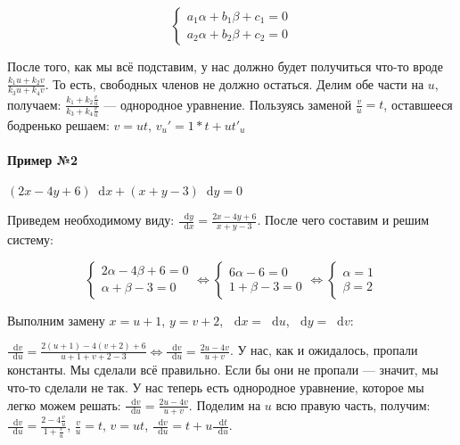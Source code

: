 \documentclass{article}
\newcommand*\diff{\mathop{}\!\mathrm{d}}
\begin{document}
\begin{enumerate}
    $$\begin{cases}
        a_1 \alpha + b_1 \beta + c_1 = 0 \\
        a_2 \alpha + b_2 \beta + c_2 = 0
    \end{cases}$$

    После того, как мы всё подставим, у нас должно будет получиться что-то вроде $\frac{k_1 u + k_2 v}{k_3 u + k_4 v}$. То есть, свободных членов не должно остаться. Делим обе части на $u$, получаем: $\frac{k_1 + k_2 \frac{v}{u}}{k_3 + k_4 \frac{v}{u}}$ — однородное уравнение. Пользуясь заменой $\frac{v}{u} = t$, оставшееся бодренько решаем: $v = ut$, $v_u' = 1 * t + ut'_u$

    \paragraph{Пример №2} $(2x - 4y + 6) \diff x + (x + y - 3) \diff y = 0$

    Приведем необходимому виду: $\frac{\diff y}{\diff x} = \frac{2x - 4y + 6}{x + y - 3}$. После чего составим и решим систему:

    $$
    \begin{cases}
        2 \alpha - 4 \beta + 6 = 0 \\
        \alpha + \beta - 3 = 0
    \end{cases} \Longleftrightarrow \begin{cases}
        6 \alpha - 6 = 0 \\
        1 + \beta - 3 = 0
    \end{cases} \Longleftrightarrow \begin{cases}
        \alpha = 1 \\
        \beta = 2
    \end{cases}
    $$

    Выполним замену $x = u + 1$, $y = v + 2$, $\diff x = \diff u$, $\diff y = \diff v$:

    $\frac{\diff v}{\diff u} = \frac{2 (u + 1) - 4 (v + 2) + 6}{u + 1 + v + 2 - 3} \Longleftrightarrow \frac{\diff v}{\diff u} = \frac{2 u - 4v}{u + v}$. У нас, как и ожидалось, пропали константы. Мы сделали всё правильно. Если бы они не пропали — значит, мы что-то сделали не так. У нас теперь есть однородное уравнение, которое мы легко можем решать: $\frac{\diff v}{\diff u} = \frac{2 u - 4v}{u + v}$. Поделим на $u$ всю правую часть, получим: $\frac{\diff v}{\diff u} = \frac{2 - 4 \frac{v}{u}}{1 + \frac{v}{u}}$, $\frac{v}{u} = t$, $v = ut$, $\frac{\diff v}{\diff u} = t + u \frac{\diff t}{\diff u}$. 
    

\end{enumerate}
\end{document}
